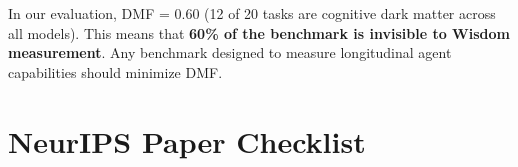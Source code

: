 \documentclass{article}
\begin{document}
In our evaluation, DMF = 0.60 (12 of 20 tasks are cognitive dark matter
across all models). This means that \textbf{60\% of the benchmark is
invisible to Wisdom measurement}. Any benchmark designed to measure
longitudinal agent capabilities should minimize DMF.





\newcommand{\answerYes}[1][]{\textbf{Yes}}
\newcommand{\answerNo}[1][]{\textbf{No}}
\newcommand{\answerNA}[1][]{\textbf{N/A}}

\section*{NeurIPS Paper Checklist}
\end{document}
